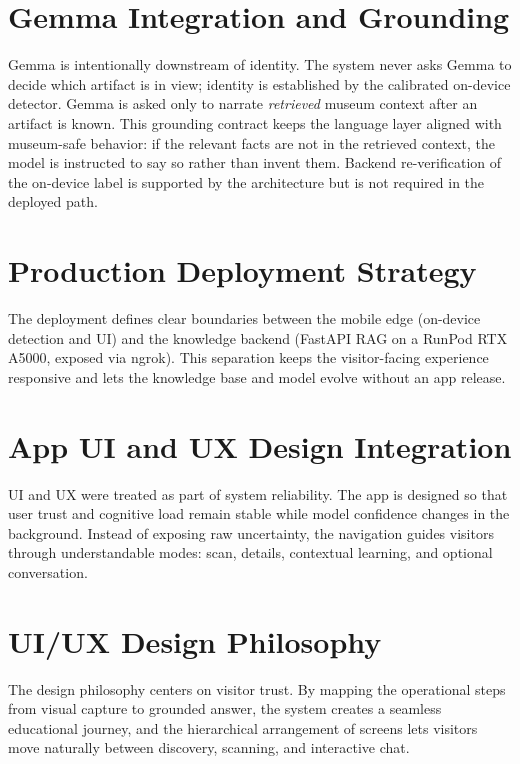 \section{Gemma Integration and Grounding}

Gemma is intentionally downstream of identity. The system never asks Gemma to decide
which artifact is in view; identity is established by the calibrated on-device
detector. Gemma is asked only to narrate \emph{retrieved} museum context after an
artifact is known. This grounding contract keeps the language layer aligned with
museum-safe behavior: if the relevant facts are not in the retrieved context, the
model is instructed to say so rather than invent them. Backend re-verification of the
on-device label is supported by the architecture but is not required in the deployed
path.

\section{Production Deployment Strategy}

The deployment defines clear boundaries between the mobile edge (on-device detection
and UI) and the knowledge backend (FastAPI RAG on a RunPod RTX A5000, exposed via ngrok).
This separation keeps the visitor-facing experience responsive and lets the knowledge
base and model evolve without an app release.

\section{App UI and UX Design Integration}

UI and UX were treated as part of system reliability. The app is designed so that user
trust and cognitive load remain stable while model confidence changes in the
background. Instead of exposing raw uncertainty, the navigation guides visitors through
understandable modes: scan, details, contextual learning, and optional conversation.

\section{UI/UX Design Philosophy}

The design philosophy centers on visitor trust. By mapping the operational steps from
visual capture to grounded answer, the system creates a seamless educational journey,
and the hierarchical arrangement of screens lets visitors move naturally between
discovery, scanning, and interactive chat.

